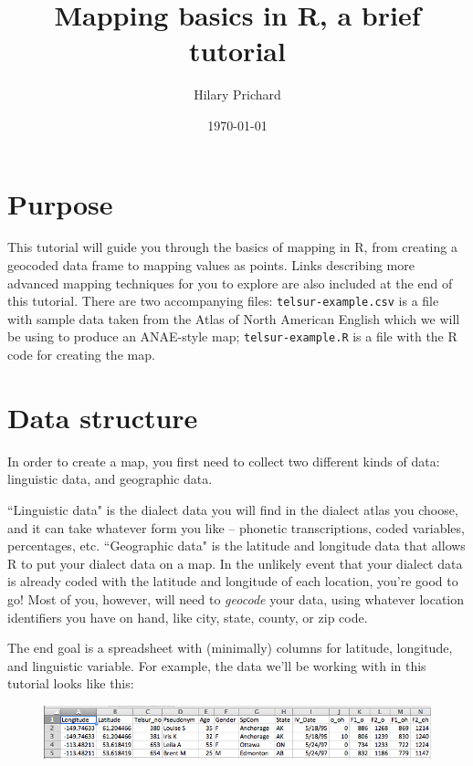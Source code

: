\documentclass[12pt]{article}
\title{Mapping basics in R, a brief tutorial}
\author{Hilary Prichard}
\date{\today}
\begin{document}
\maketitle

\section{Purpose}

This tutorial will guide you through the basics of mapping in R, from creating a geocoded data frame to mapping values as points. Links describing more advanced mapping techniques for you to explore are also included at the end of this tutorial. There are two accompanying files: \texttt{telsur-example.csv} is a file with sample data taken from the Atlas of North American English which we will be using to produce an ANAE-style map; \texttt{telsur-example.R} is a file with the R code for creating the map.

\section{Data structure}

In order to create a map, you first need to collect two different kinds of data: linguistic data, and geographic data. 

``Linguistic data" is the dialect data you will find in the dialect atlas you choose, and it can take whatever form you like -- phonetic transcriptions, coded variables, percentages, etc. ``Geographic data" is the latitude and longitude data that allows R to put your dialect data on a map. In the unlikely event that your dialect data is already coded with the latitude and longitude of each location, you're good to go! Most of you, however, will need to \emph{geocode} your data, using whatever location identifiers you have on hand, like city, state, county, or zip code. 

The end goal is a spreadsheet with (minimally) columns for latitude, longitude, and linguistic variable. For example, the data we'll be working with in this tutorial looks like this:

\begin{figure}[h]
\includegraphics[width=\linewidth]{data.png}
\end{figure}
\end{document}
